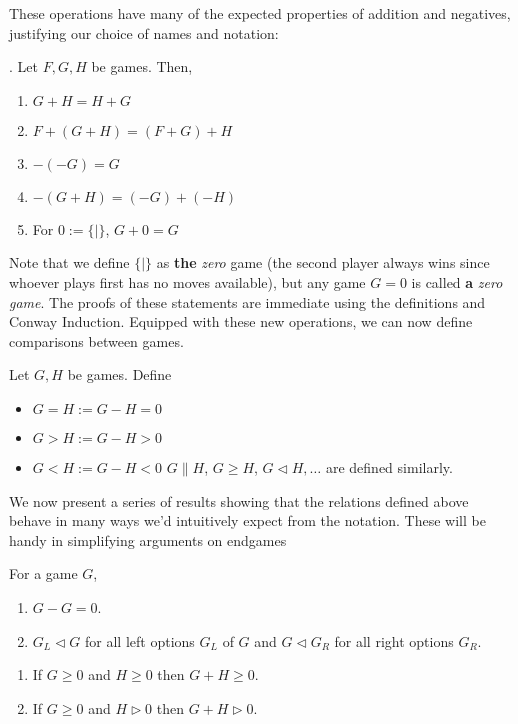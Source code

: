 \documentclass[../math194_paper.tex]{subfiles}
\begin{document}
These operations have many of the expected properties of addition and negatives, justifying 
our choice of names and notation:
\begin{theorem}. Let $F,G,H$ be games. Then,
    \label{additionprop}
    \begin{enumerate}
        \item $G+H = H+G$
        \item $F + (G+H) = (F+G) + H$
        \item $-(-G) = G$
        \item $-(G+H) = (-G) + (-H)$
        \item For $0 := \{|\}$, $G+0=G$
    \end{enumerate}
\end{theorem}
Note that we define $\{ | \}$ as \textbf{the} \textit{zero} game (the second player always wins since 
whoever plays first has no moves available), but any game $G = 0$ is called \textbf{a} \textit{zero game}.
The proofs of these statements are immediate using the definitions and Conway Induction. 
Equipped with these new operations, we can now define comparisons between games.
\begin{definition} Let $G, H$ be games. Define
\begin{itemize}
    \item $G = H := G - H = 0$
    \item $G > H := G - H > 0$
    \item $G < H := G - H < 0$
$G \parallel H$, $G \geq H$, $G \triangleleft H, \ldots$ are defined similarly.
\end{itemize}
\end{definition}

We now present a series of results showing that the relations defined above 
behave in many ways we'd intuitively expect from the notation. These will be 
handy in simplifying arguments on endgames

\begin{theorem} For a game $G$,
    \label{reflexequal}
    \begin{enumerate}
        \item $G -G = 0$.
        \item $G_L \triangleleft G$ for all left options $G_L$ of $G$ and $G \triangleleft G_R$ 
        for all right options $G_R$.
    \end{enumerate}
\end{theorem}

\begin{lemma} \: 
\begin{enumerate}
    \item If $G \geq 0$ and $H \geq 0$ then $G+H \geq 0$.
    \item If $G \geq 0$ and $H \triangleright 0$ then $G+H \triangleright 0$.
\end{enumerate}
\end{lemma}
\end{document}

